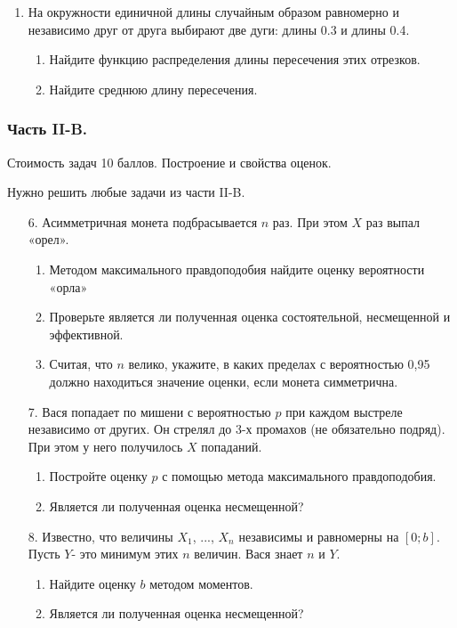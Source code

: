 \documentclass[12pt, a4paper]{article}\usepackage[]{graphicx}\usepackage[]{color}
\begin{document}
\begin{enumerate}
\item На окружности единичной длины случайным образом равномерно и независимо друг от друга выбирают две дуги: длины 0.3 и длины 0.4.
\begin{enumerate}
\item Найдите функцию распределения длины пересечения этих отрезков.
\item Найдите среднюю длину пересечения.
\end{enumerate}
\end{enumerate}

\subsubsection*{Часть II-B.}

Стоимость задач 10 баллов. Построение и свойства оценок.

Нужно решить любые \textbf{} задачи из части II-B.

\begin{enumerate}
\item[6.] Асимметричная монета подбрасывается $n$ раз. При этом $X$ раз выпал «орел».
\begin{enumerate}
\item Методом максимального правдоподобия найдите оценку вероятности «орла»
\item Проверьте является ли полученная оценка состоятельной, несмещенной и эффективной.
\item Считая, что $n$ велико, укажите, в каких пределах с вероятностью 0,95 должно находиться значение оценки, если монета симметрична.
\end{enumerate}

\item[7.] Вася попадает по мишени с вероятностью $p$ при каждом выстреле независимо от других. Он стрелял до 3-х промахов (не обязательно подряд). При этом у него получилось $X$ попаданий.
\begin{enumerate}
\item Постройте оценку $p$ с помощью метода максимального правдоподобия.
\item Является ли полученная оценка несмещенной?
\end{enumerate}

\item[8.] Известно, что величины $X_{1}$, ..., $X_{n}$ независимы и равномерны на $[0;b]$. Пусть $Y$- это минимум этих $n$ величин. Вася знает $n$ и $Y$.
\begin{enumerate}
\item Найдите оценку $b$ методом моментов.
\item Является ли полученная оценка несмещенной?
\end{enumerate}
\end{enumerate}
\end{document}
